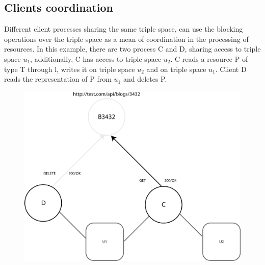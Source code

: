 \subsection{Clients coordination}

Different client processes sharing the same triple space, can use the blocking operations over the triple space as a mean of coordination in the processing of resources. In this example, there are two process C and D, sharing access to triple space $u_1$, additionally, C has access to triple space $u_2$. C reads a resource P of type T through l, writes it on triple space $u_2$ and on triple space $u_1$. Client D reads the representation of P from $u_1$ and deletes P.
\\
\begin{figure}[htb!]
\centering%
\includegraphics{coord.png}
\end{figure}

